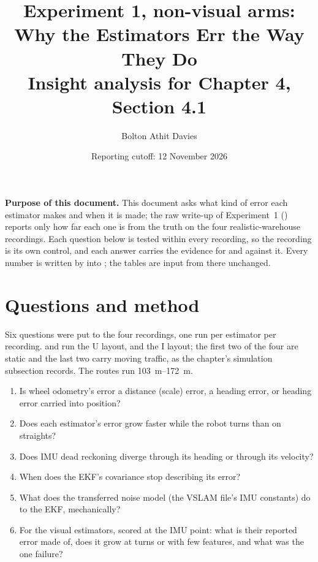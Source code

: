\documentclass[11pt,a4paper,notitlepage]{report}
\title{Experiment 1, non-visual arms: Why the Estimators Err the Way They Do\\
       \large Insight analysis for Chapter 4, Section 4.1}
\author{Bolton Athit Davies}
\date{Reporting cutoff: 12 November 2026}
\begin{document}
\maketitle

\noindent\textbf{Purpose of this document.} This document asks what kind of
error each estimator makes and when it is made; the raw write-up of
Experiment~1 () reports only how far each one is
from the truth on the four realistic-warehouse recordings. Each question below
is tested within every recording, so the recording is its own control, and
each answer carries the evidence for and against it. Every number is written by
 into
; the tables are input from
there unchanged.

\section{Questions and method}

Six questions were put to the four 
recordings, one run per estimator per recording.
 and  run the U
layout,  and  the
I layout; the first two of the four are static and the last two carry moving
traffic, as the chapter's simulation subsection records. The routes run
\SIrange{103}{172}{\metre}.

\begin{enumerate}[label=Q\arabic*.]
\item Is wheel odometry's error a distance (scale) error, a heading error, or
      heading error carried into position?
\item Does each estimator's error grow faster while the robot turns than on
      straights?
\item Does IMU dead reckoning diverge through its heading or through its
      velocity?
\item When does the EKF's covariance stop describing its error?
\item What does the transferred noise model (the VSLAM file's IMU constants)
      do to the EKF, mechanically?
\item For the visual estimators, scored at the IMU point: what is their
      reported error made of, does it grow at turns or with few features, and
      what was the one failure?
\end{enumerate}
\end{document}
